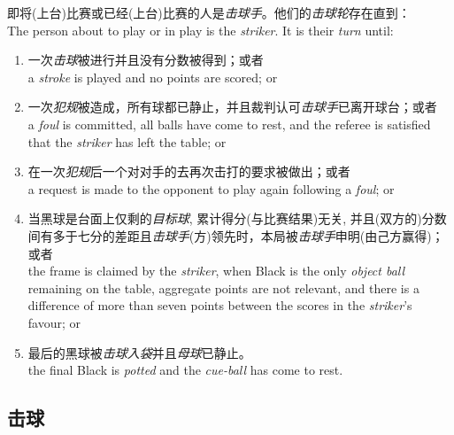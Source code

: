 \noindent 即将(上台)比赛或已经(上台)比赛的人是\emph{击球手}。他们的\emph{击球轮}存在直到：\\
The person about to play or in play is the \emph{striker}. It is their \emph{turn} until:
\begin{enumerate}[label=(\alph*)]
    \item 一次\emph{击球}被进行并且没有分数被得到；或者\\
    a \emph{stroke} is played and no points are scored; or
    \item 一次\emph{犯规}被造成，所有球都已静止，并且裁判认可\emph{击球手}已离开球台；或者\\
    a \emph{foul} is committed, all balls have come to rest, and the referee is satisfied that the \emph{striker} has left the table; or
    \item 在一次\emph{犯规}后一个对对手的去再次击打的要求被做出；或者\\
    a request is made to the opponent to play again following a \emph{foul}; or
    \item 当黑球是台面上仅剩的\emph{目标球}, 累计得分(与比赛结果)无关, 并且(双方的)分数间有多于七分的差距且\emph{击球手}(方)领先时，本局被\emph{击球手}申明(由己方赢得)；或者\\
    the frame is claimed by the \emph{striker}, when Black is the only \emph{object ball} remaining on the table, aggregate points are not relevant, and there is a difference of more than seven points between the scores in the \emph{striker}'s favour; or
    \item 最后的黑球被\emph{击球入袋}并且\emph{母球}已静止。\\
    the final Black is \emph{potted} and the \emph{cue-ball} has come to rest.
\end{enumerate}

\subsection{击球}

